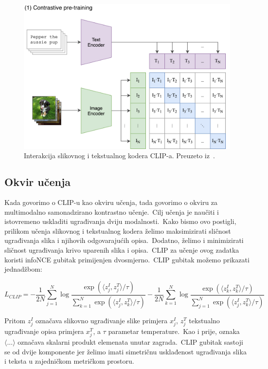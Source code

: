 \documentclass[times, utf8, seminar, numeric]{fer}
\begin{document}
\begin{figure}[h]
    \centering
    \includegraphics[scale=0.5]{./Slike/CLIP_arhitektura.png}
    \caption{Interakcija slikovnog i tekstualnog kodera CLIP-a. Preuzeto iz~\cite{radford2021learning}.}
    \label{fig:CLIP_architecture}
\end{figure}

\subsection{Okvir učenja}

Kada govorimo o CLIP-u kao okviru učenja, tada govorimo o okviru za multimodalno samonadzirano kontrastno učenje.\ Cilj učenja je naučiti i istovremeno uskladiti ugrađivanja dviju modalnosti.\ 
Kako bismo ovo postigli, prilikom učenja slikovnog i tekstualnog kodera želimo maksimizirati sličnost ugrađivanja slika i njihovih odgovarajućih opisa.\ Dodatno, želimo i minimizirati sličnost ugrađivanja krivo uparenih slika i opisa.\ 
CLIP za učenje ovog zadatka koristi infoNCE gubitak primijenjen dvosmjerno.\ CLIP gubitak možemo prikazati jednadžbom: 

\begin{equation}
    L_{CLIP} = - \frac{1}{2N} \sum_{j=1}^{N} \log{\frac{\exp(\langle z_{j}^I, z_{j}^T \rangle / \tau)}{\sum_{k=1}^{N}{\exp(\langle z_{j}^I, z_{k}^T \rangle / \tau)}}} - \frac{1}{2N} \sum_{k=1}^{N} \log{\frac{\exp(\langle z_{k}^I, z_{k}^T \rangle / \tau)}{\sum_{j=1}^{N}{\exp(\langle z_{j}^I, z_{k}^T \rangle / \tau)}}}
    \label{eq:CLIP_loss}
\end{equation}

Pritom $z_{j}^I$ označava slikovno ugrađivanje slike primjera $x_{j}^I$, $z_{j}^T$ tekstualno ugrađivanje opisa primjera $x_{j}^T$, a $\tau$ parametar temperature.\ 
Kao i prije, oznaka $\langle ... \rangle$ označava skalarni produkt elemenata unutar zagrada.\ 
CLIP gubitak sastoji se od dvije komponente jer želimo imati simetričnu usklađenost ugrađivanja slika i teksta u zajedničkom metričkom prostoru.\
\end{document}
